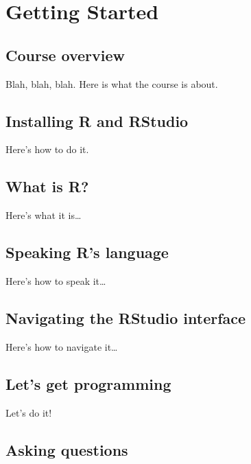 \documentclass[]{book}
\begin{document}
\hypertarget{part-getting-started}{%
\part{Getting Started}\label{part-getting-started}}

\hypertarget{course-overview}{%
\chapter{Course overview}\label{course-overview}}

Blah, blah, blah. Here is what the course is about.

\hypertarget{installing-r-and-rstudio}{%
\chapter{Installing R and RStudio}\label{installing-r-and-rstudio}}

Here's how to do it.

\hypertarget{what-is-r}{%
\chapter{What is R?}\label{what-is-r}}

Here's what it is\ldots{}

\hypertarget{speaking-rs-language}{%
\chapter{Speaking R's language}\label{speaking-rs-language}}

Here's how to speak it\ldots{}

\hypertarget{navigating-the-rstudio-interface}{%
\chapter{Navigating the RStudio interface}\label{navigating-the-rstudio-interface}}

Here's how to navigate it\ldots{}

\hypertarget{lets-get-programming}{%
\chapter{Let's get programming}\label{lets-get-programming}}

Let's do it!

\hypertarget{asking-questions}{%
\chapter{Asking questions}\label{asking-questions}}
\end{document}
